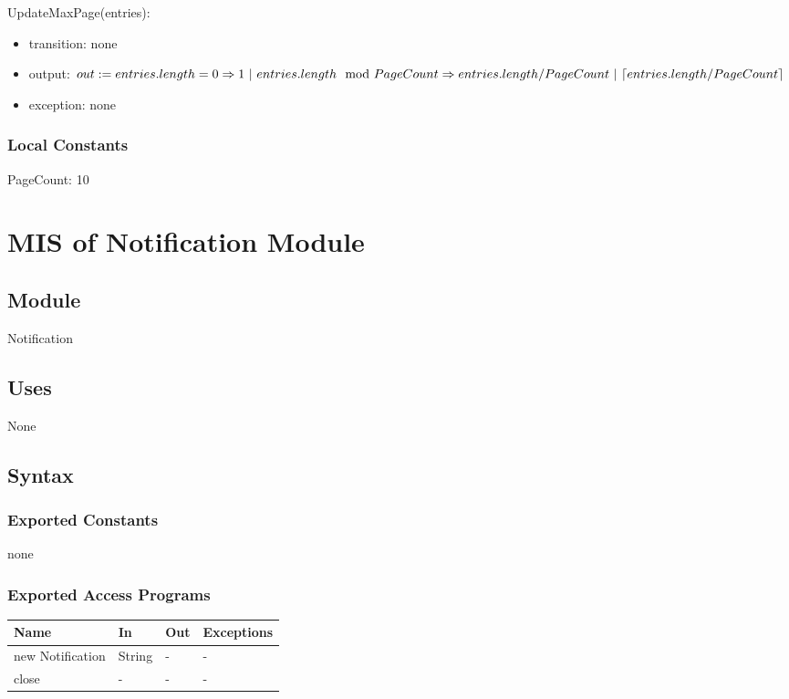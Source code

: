 \documentclass[12pt, titlepage]{article}
\begin{document}
\noindent UpdateMaxPage(entries):
\begin{itemize}
\item transition: none
\item output: $out := entries.length = 0 \Rightarrow 1\ |\ entries.length \mod PageCount\\ \Rightarrow entries.length/PageCount\ |\ \lceil entries.length/PageCount \rceil$
\item exception: none
\end{itemize}

\subsubsection{Local Constants}

PageCount: 10

\newpage

\section{MIS of Notification Module} \label{mNoti}

\subsection{Module}

Notification

\subsection{Uses}

None

\subsection{Syntax}

\subsubsection{Exported Constants}
none

\subsubsection{Exported Access Programs}
\begin{center}
\begin{tabular}{p{4cm} p{2cm} p{4cm} p{4cm}}
\hline
\textbf{Name} & \textbf{In} & \textbf{Out} & \textbf{Exceptions} \\
\hline
new Notification & String & - & -\\
close & - & - &  -\\
\hline
\end{tabular}
\end{center}
\end{document}
